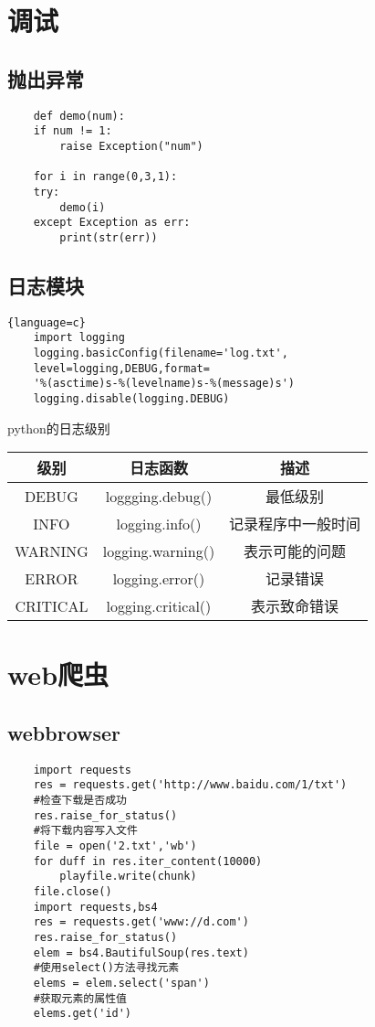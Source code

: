 \documentclass[twocolumn]{article}
\begin{document}
	\section{调试}
	\subsection{抛出异常}
	\begin{lstlisting}
	def demo(num):
	if num != 1:
 		raise Exception("num")
		
	for i in range(0,3,1):
	try:
		demo(i)
	except Exception as err:
		print(str(err))
	\end{lstlisting}
	
	\subsection{日志模块}
	
	\begin{lstlisting}{language=c}
	import logging
	logging.basicConfig(filename='log.txt',
	level=logging,DEBUG,format=
	'%(asctime)s-%(levelname)s-%(message)s')
	logging.disable(logging.DEBUG)
	\end{lstlisting}
	
	\noindent python的日志级别
	
	\begin{tabular}{|c|c|c|}
		\hline
		级别 &日志函数 &描述 \\
		\hline
		DEBUG &loggging.debug() &最低级别 \\
		\hline
		INFO & logging.info() &记录程序中一般时间\\
		\hline
		WARNING &logging.warning() & 表示可能的问题\\
		\hline
		ERROR & logging.error() & 记录错误 \\
		\hline
		CRITICAL & logging.critical() & 表示致命错误\\
		\hline 
	\end{tabular}
	\section{web爬虫}
	\subsection{webbrowser}
	\begin{lstlisting}
	import requests
	res = requests.get('http://www.baidu.com/1/txt')
	#检查下载是否成功
	res.raise_for_status()
	#将下载内容写入文件
	file = open('2.txt','wb')
	for duff in res.iter_content(10000)
		playfile.write(chunk)
	file.close()
	import requests,bs4
	res = requests.get('www://d.com')
	res.raise_for_status()
	elem = bs4.BautifulSoup(res.text)
	#使用select()方法寻找元素
	elems = elem.select('span')
	#获取元素的属性值
	elems.get('id')
	\end{lstlisting}
	\onecolumn
\end{document}

